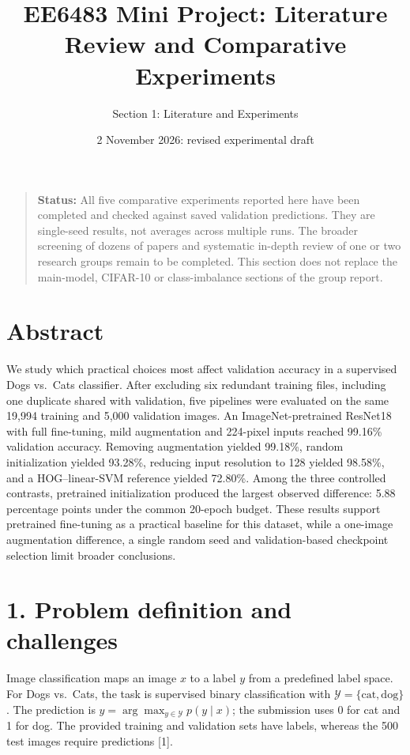 \documentclass[
  10pt,
  a4paper,
]{article}
\title{EE6483 Mini Project: Literature Review and Comparative
Experiments}
\author{Section 1: Literature and Experiments}
\date{2 November 2026: revised experimental draft}
\begin{document}
\maketitle

\begin{quote}
\textbf{Status:} All five comparative experiments reported here have
been completed and checked against saved validation predictions. They
are single-seed results, not averages across multiple runs. The broader
screening of dozens of papers and systematic in-depth review of one or
two research groups remain to be completed. This section does not
replace the main-model, CIFAR-10 or class-imbalance sections of the
group report.
\end{quote}

\section{Abstract}\label{abstract}

We study which practical choices most affect validation accuracy in a
supervised Dogs vs.~Cats classifier. After excluding six redundant
training files, including one duplicate shared with validation, five
pipelines were evaluated on the same 19,994 training and 5,000
validation images. An ImageNet-pretrained ResNet18 with full
fine-tuning, mild augmentation and 224-pixel inputs reached 99.16\%
validation accuracy. Removing augmentation yielded 99.18\%, random
initialization yielded 93.28\%, reducing input resolution to 128 yielded
98.58\%, and a HOG--linear-SVM reference yielded 72.80\%. Among the
three controlled contrasts, pretrained initialization produced the
largest observed difference: 5.88 percentage points under the common
20-epoch budget. These results support pretrained fine-tuning as a
practical baseline for this dataset, while a one-image augmentation
difference, a single random seed and validation-based checkpoint
selection limit broader conclusions.

\section{1. Problem definition and
challenges}\label{problem-definition-and-challenges}

Image classification maps an image \(x\) to a label \(y\) from a
predefined label space. For Dogs vs.~Cats, the task is supervised binary
classification with \(\mathcal{Y}=\{\text{cat},\text{dog}\}\). The
prediction is \(\hat{y}=\arg\max_{y\in\mathcal{Y}}p(y\mid x)\); the
submission uses 0 for cat and 1 for dog. The provided training and
validation sets have labels, whereas the 500 test images require
predictions {[}1{]}.
\end{document}
